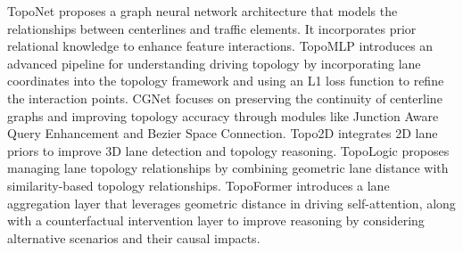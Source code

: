 TopoNet \cite{li2023graph} proposes a graph neural network architecture that models the relationships between centerlines and traffic elements. It incorporates prior relational knowledge to enhance feature interactions. TopoMLP \cite{wu2023topomlp} introduces an advanced pipeline for understanding driving topology by incorporating lane coordinates into the topology framework and using an L1 loss function to refine the interaction points. CGNet \cite{han2024continuity} focuses on preserving the continuity of centerline graphs and improving topology accuracy through modules like Junction Aware Query Enhancement and Bezier Space Connection. Topo2D \cite{li2024enhancing} integrates 2D lane priors to improve 3D lane detection and topology reasoning. TopoLogic \cite{fu2024topologic} proposes managing lane topology relationships by combining geometric lane distance with similarity-based topology relationships. TopoFormer \cite{lv2024t2sg} introduces a lane aggregation layer that leverages geometric distance in driving self-attention, along with a counterfactual intervention layer to improve reasoning by considering alternative scenarios and their causal impacts.
